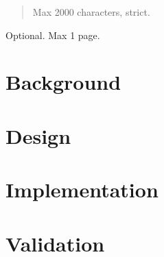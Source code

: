 \documentclass[12pt,a4paper,openright,twoside]{book}
\begin{document}
\frontmatter


\begin{abstract}
Max 2000 characters, strict.
\end{abstract}

\begin{acknowledgements} %
Optional. Max 1 page.
\end{acknowledgements}

\tableofcontents

\listoffigures

\lstlistoflistings

\mainmatter

\chapter{\introductionname}
\label{chap:introduction}
\chapter{Background}
\label{chap:background}
\chapter{Design}
\label{chap:design}
\chapter{Implementation}
\label{chap:implementation}
\chapter{Validation}
\label{chap:validation}
\chapter{\conclusionsname}
\label{chap:conclusions}

\nocite{*}


\end{document}
